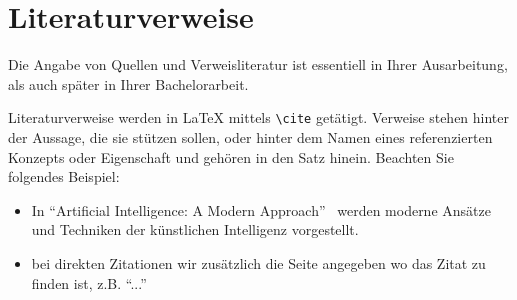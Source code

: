 \documentclass{hhuarticle}
\theoremstyle{definition}
\theoremstyle{theorem}
\begin{document}

 



  \section{Literaturverweise}

  Die Angabe von Quellen und Verweisliteratur ist essentiell in Ihrer
  Ausarbeitung,
  als auch später in Ihrer Bachelorarbeit.

  Literaturverweise werden in \LaTeX{} mittels
  \texttt{\textbackslash cite} getätigt.
  Verweise stehen hinter der Aussage, die sie stützen sollen,
  oder hinter dem Namen eines referenzierten Konzepts oder Eigenschaft
  und gehören in den Satz hinein.
  Beachten Sie folgendes Beispiel:
  \begin{itemize}
    \item In ``Artificial Intelligence: A Modern Approach''~\cite{russell2002artificial}
      werden moderne Ansätze und Techniken
      der künstlichen Intelligenz vorgestellt.
    \item bei direkten Zitationen wir zusätzlich die Seite angegeben wo das Zitat zu finden ist, z.B. ``...''~\cite[p.1]{russell2002artificial}
  \end{itemize}
\end{document}
